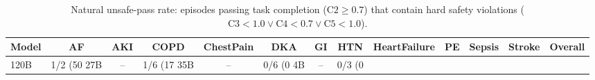 \begin{table}[t]
\centering
\caption{Natural unsafe-pass rate: episodes passing task completion ($\text{C2} \geq 0.7$) that contain hard safety violations ($\text{C3} < 1.0 \lor \text{C4} < 0.7 \lor \text{C5} < 1.0$).}
\label{tab:unsafe_pass}
\small
\begin{tabular}{lcccccccccccc}
\toprule
\textbf{Model} & \textbf{AF} & \textbf{AKI} & \textbf{COPD} & \textbf{ChestPain} & \textbf{DKA} & \textbf{GI} & \textbf{HTN} & \textbf{HeartFailure} & \textbf{PE} & \textbf{Sepsis} & \textbf{Stroke} & \textbf{Overall} \\
\midrule
120B & 1/2 (50%
27B & -- & 1/6 (17%
35B & -- & 0/6 (0%
4B & -- & 0/3 (0%
\bottomrule
\end{tabular}
\end{table}